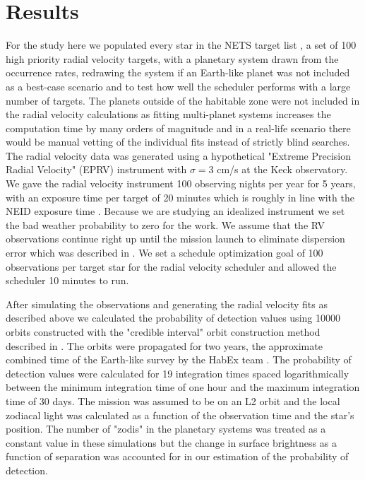 \section{Results}

For the study here we populated every star in the NETS target list
\citep{guptaTargetPrioritization2021}, a set of 100 high priority radial
velocity targets, with a planetary system drawn from the
\citet{dulzJointRadialVelocity2020} occurrence rates, redrawing the system if
an Earth-like planet was not included as a best-case scenario and to test how
well the scheduler performs with a large number of targets. The planets outside
of the habitable zone were not included in the radial velocity calculations as
fitting multi-planet systems increases the computation time by many orders of
magnitude and in a real-life scenario there would be manual vetting of the
individual fits instead of strictly blind searches. The radial velocity data
was generated using a hypothetical "Extreme Precision Radial Velocity" (EPRV)
instrument with $\sigma = 3$ cm/s at the Keck observatory. We gave the radial
velocity instrument 100 observing nights per year for 5 years, with an exposure
time per target of 20 minutes which is roughly in line with the NEID exposure
time \citep{guptaTargetPrioritization2021}. Because we are studying an
idealized instrument we set the bad weather probability to zero for the work.
We assume that the RV observations continue right up until the mission launch
to eliminate dispersion error which was described in . We
set a schedule optimization goal of 100 observations per target star for the
radial velocity scheduler and allowed the scheduler 10 minutes to run.

After simulating the observations and generating the radial velocity fits as
described above we calculated the probability of detection values using 10000
orbits constructed with the "credible interval" orbit construction method
described in . The orbits were propagated for two years,
the approximate combined time of the Earth-like survey by the HabEx team
\citep{gaudiHabitableExoplanetObservatory2020}. The probability of detection
values were calculated for 19 integration times spaced logarithmically between
the minimum integration time of one hour and the maximum integration time of 30
days. The mission was assumed to be on an L2 orbit and the local zodiacal light
was calculated as a function of the observation time and the star's position.
The number of "zodis" in the planetary systems was treated as a constant value
in these simulations but the change in surface brightness as a function of
separation was accounted for in our estimation of the probability of detection.

